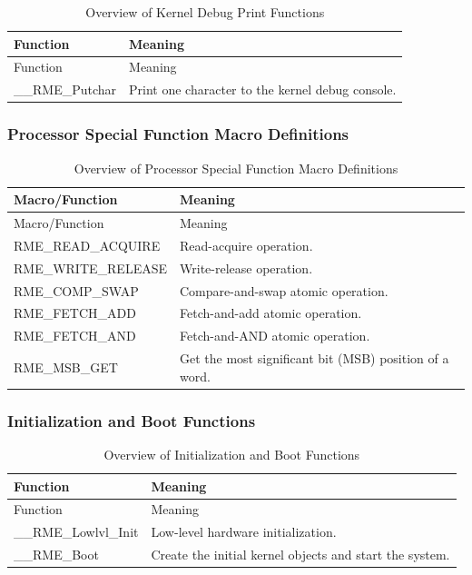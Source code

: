 \begin{xltabular}{\textwidth}{@{}>{\hsize\raggedright\arraybackslash}X>{\hsize\raggedright\arraybackslash}X@{}}
\caption{Overview of Kernel Debug Print Functions}\label{tab:7-8-kernel-debug-print-function-overview}\\
\toprule
Function & Meaning\tabularnewline
\endfirsthead
\toprule
Function & Meaning\tabularnewline
\midrule
\endhead
\bottomrule
\endlastfoot
\_\_RME\_Putchar & Print one character to the kernel debug console.\tabularnewline
\end{xltabular}
\nopagebreak[4]

\subsubsection{Processor Special Function Macro Definitions}\label{subsubsec:7-processor-special-function-macros}

\begin{xltabular}{\textwidth}{@{}>{\hsize\raggedright\arraybackslash}X>{\hsize\raggedright\arraybackslash}X@{}}
\caption{Overview of Processor Special Function Macro Definitions}\label{tab:7-9-processor-special-function-macros-overview}\\
\toprule
Macro/Function & Meaning\tabularnewline
\endfirsthead
\toprule
Macro/Function & Meaning\tabularnewline
\midrule
\endhead
\bottomrule
\endlastfoot
RME\_READ\_ACQUIRE & Read-acquire operation.\tabularnewline
RME\_WRITE\_RELEASE & Write-release operation.\tabularnewline
RME\_COMP\_SWAP & Compare-and-swap atomic operation.\tabularnewline
RME\_FETCH\_ADD & Fetch-and-add atomic operation.\tabularnewline
RME\_FETCH\_AND & Fetch-and-AND atomic operation.\tabularnewline
RME\_MSB\_GET & Get the most significant bit (MSB) position of a word.\tabularnewline
\end{xltabular}
\nopagebreak[4]

\subsubsection{Initialization and Boot Functions}\label{subsubsec:7-init-and-boot-functions}

\begin{xltabular}{\textwidth}{@{}>{\hsize\raggedright\arraybackslash}X>{\hsize\raggedright\arraybackslash}X@{}}
\caption{Overview of Initialization and Boot Functions}\label{tab:7-10-init-and-boot-functions-overview}\\
\toprule
Function & Meaning\tabularnewline
\endfirsthead
\toprule
Function & Meaning\tabularnewline
\midrule
\endhead
\bottomrule
\endlastfoot
\_\_RME\_Lowlvl\_Init & Low-level hardware initialization.\tabularnewline
\_\_RME\_Boot & Create the initial kernel objects and start the system.\tabularnewline
\end{xltabular}
\nopagebreak[4]

